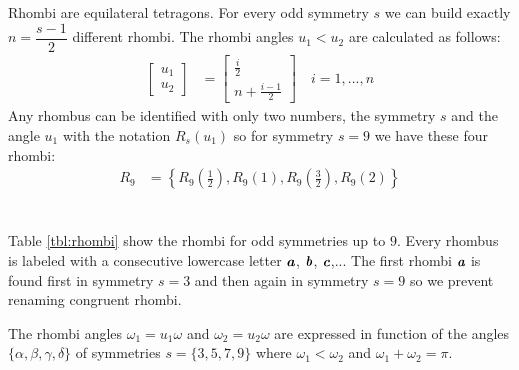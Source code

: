 \documentclass[11pt]{article}
\def\mathbi#1{\textbf{\em #1}}
\begin{document}
Rhombi are equilateral tetragons. For every odd symmetry $s$ we can build exactly $n = \dfrac{s-1}2$ different rhombi. The rhombi angles $u_1 < u_2$ are calculated as follows:
\begin{align}
\left[ \begin{array}{c} u_1 \\ u_2 \end{array} \right]
 &= \left[ \begin{array}{c} \frac{i}2 \\ n + \frac{i-1}2 \end{array} \right]
 \quad i = 1,...,n
\end{align}
Any rhombus can be identified with only two numbers, the symmetry $s$ and the angle $u_1$ with the notation $R_s(u_1)$ so for symmetry $s=9$ we have these four rhombi:
\begin{align}
R_9 &= \left\{ R_9\left(\frac{1}2\right), R_9(1), R_9\left(\frac{3}2\right), R_9(2) \right\}
\end{align}
\\\\
Table \ref{tbl:rhombi} show the rhombi for odd symmetries up to $9$. Every rhombus is labeled with a consecutive lowercase letter $\mathbi{a}$, $\mathbi{b}$, $\mathbi{c}$,... The first rhombi $\mathbi{a}$ is found first in symmetry $s=3$ and then again in symmetry $s=9$ so we prevent renaming congruent rhombi.

The rhombi angles $\omega_1 = u_1\omega$ and $\omega_2 = u_2\omega$ are expressed in function of the angles $\{\alpha,\beta,\gamma,\delta\}$ of symmetries $s=\{3,5,7,9\}$ where $\omega_1 < \omega_2$ and $\omega_1 + \omega_2 = \pi$.
\end{document}
